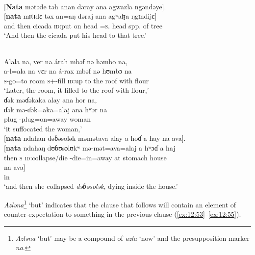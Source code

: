 \medskip  
{}\\
{}[\textbf{Nata}  mətəde  təh  anan  dəray  ana  agwazla  ngəndəye].\\
\gll  {}[\textbf{nata}  mɪtɪdɛ təx an=aŋ dəraj ana agʷaɮa ŋgɪndijɛ]\\
      {and then}  cicada  {\textsc{id}:put on head}  {\DAT}=\textsc{s}.{\IO}  head  {\DAT} {spp. of tree}  {\DEM}\\
\glt  ‘And then the cicada put his head to that tree.’ 
\z 

\clearpage
\ea \label{ex:12:52}
\\
Alala na,  ver na árah mbəf nə həmbo na,\\  
\gll  a-l=ala na vɛr na á-rax mbəf nə hʊmbɔ na\\  
      \textsc{s}-go=to  {\PSP}  room  {\PSP}  \textsc{s}+{\IFV}-fill  {\textsc{id}:up to the roof}  with  flour  {\PSP}\\            
\glt ‘Later, the room, it filled to the roof with flour,’\\      
      
\medskip 
ɗək məɗəkaka alay ana hor na,\\
\gll ɗək mə-ɗək=aka=alaj ana hʷɔr na\\
     plug  {\NOM}{}-plug=on=away  {\DAT} woman  {\PSP}\\
\glt ‘it suffocated the woman,’\\
 
\medskip
{}[\textbf{nata} ndahan dəɓəsolək məmətava alay a hoɗ a hay na ava].\\
\gll {}[\textbf{nata} ndahaŋ dʊɓʊsɔlʊkʷ mə-mət=ava=alaj a hʷɔɗ a haj \\
     then    \textsc{s}   \textsc{id}:collapse/die  {\NOM}{}-die=in=away  at  stomach  {\GEN}  house  \\

\medskip
\gll na ava]\\
 {\PSP}  in\\
\glt  ‘and then she collapsed \textit{dəɓəsolək}, dying inside the house.’
\z 

\textit{Azləna}\footnote{\textit{Azləna} ‘but’ may be a compound of \textit{azla} ‘now’ and the presupposition marker \textit{na}.} ‘but’ indicates that the clause that follows will contain an element of counter-expectation to something in the previous clause (\ref{ex:12:53}--\ref{ex:12:55}).

